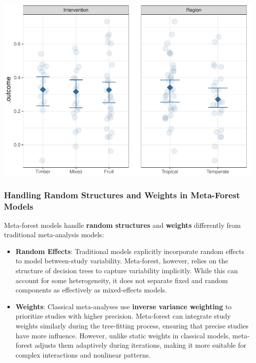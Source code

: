 \documentclass[
]{book}
\newenvironment{Shaded}{\begin{snugshade}}{\end{snugshade}}
\newcommand{\AttributeTok}[1]{\textcolor[rgb]{0.13,0.29,0.53}{#1}}
\newcommand{\CommentTok}[1]{\textcolor[rgb]{0.56,0.35,0.01}{\textit{#1}}}
\newcommand{\ConstantTok}[1]{\textcolor[rgb]{0.56,0.35,0.01}{#1}}
\newcommand{\DecValTok}[1]{\textcolor[rgb]{0.00,0.00,0.81}{#1}}
\newcommand{\FloatTok}[1]{\textcolor[rgb]{0.00,0.00,0.81}{#1}}
\newcommand{\FunctionTok}[1]{\textcolor[rgb]{0.13,0.29,0.53}{\textbf{#1}}}
\newcommand{\NormalTok}[1]{#1}
\newcommand{\SpecialCharTok}[1]{\textcolor[rgb]{0.81,0.36,0.00}{\textbf{#1}}}
\begin{document}
\begin{Shaded}
\end{Shaded}

\includegraphics{_main_files/figure-latex/unnamed-chunk-14-3.pdf}

\subsubsection{Handling Random Structures and Weights in Meta-Forest Models}\label{handling-random-structures-and-weights-in-meta-forest-models}

Meta-forest models handle \textbf{random structures} and \textbf{weights} differently from traditional meta-analysis models:

\begin{itemize}
\item
  \textbf{Random Effects}: Traditional models explicitly incorporate random effects to model between-study variability. Meta-forest, however, relies on the structure of decision trees to capture variability implicitly. While this can account for some heterogeneity, it does not separate fixed and random components as effectively as mixed-effects models.
\item
  \textbf{Weights}: Classical meta-analyses use \textbf{inverse variance weighting} to prioritize studies with higher precision. Meta-forest can integrate study weights similarly during the tree-fitting process, ensuring that precise studies have more influence. However, unlike static weights in classical models, meta-forest adjusts them adaptively during iterations, making it more suitable for complex interactions and nonlinear patterns.
\end{itemize}
\end{document}
